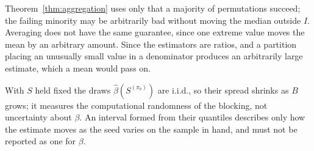 \begin{remark}
\label{rem:agg_mean}
    Theorem~\ref{thm:aggregation} uses only that a majority of permutations succeed; the failing minority may be arbitrarily bad without moving the median outside $I$. Averaging does not have the same guarantee, since one extreme value moves the mean by an arbitrary amount. Since the estimators are ratios, and a partition placing an unusually small value in a denominator produces an arbitrarily large estimate, which a mean would pass on.
\end{remark}

\begin{remark}
\label{rem:agg_not_sampling}
    With $S$ held fixed the draws $\hat{\beta}(S^{(\pi_b)})$ are i.i.d., so their spread shrinks as $B$ grows; it measures the computational randomness of the blocking, not uncertainty about $\beta$. An interval formed from their quantiles describes only how the estimate moves as the seed varies on the sample in hand, and must not be reported as one for $\beta$.
\end{remark}